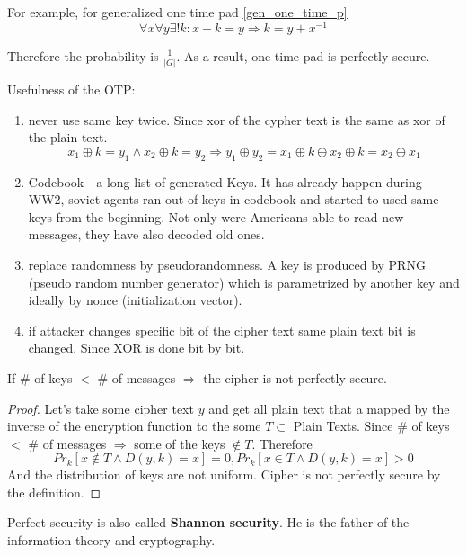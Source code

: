 \begin{example}
	For example, for generalized one time pad \cref{gen_one_time_p}
	\[ \forall x \forall y \exists !k: x + k = y \Rightarrow k = y + x^{-1} \]

	Therefore the probability is $\frac{1}{|G|}$. As a result, one time pad is perfectly secure.
\end{example}

\begin{properties}
Usefulness of the OTP:
	\begin{enumerate}
		\item never use same key twice. Since xor of the cypher text is the same as xor of the plain text.
		\[ x_1 \oplus k = y_1 \land x_2 \oplus k = y_2 \Rightarrow y_1 \oplus y_2 = x_1 \oplus k \oplus x_2 \oplus k = x_2 \oplus x_1 \]
		\item Codebook - a long list of generated Keys.
			It has already happen during WW2, soviet agents ran out of keys in codebook and started to used same keys from the beginning.
			Not only were Americans able to read new messages, they have also decoded old ones.
		\item replace randomness by pseudorandomness. A key is produced by PRNG (pseudo random number generator) which is parametrized by another key and ideally by nonce (initialization vector).
		\item if attacker changes specific bit of the cipher text same plain text bit is changed. Since XOR is done bit by bit.
	\end{enumerate}
\end{properties}

\begin{theorem}
	If \# of keys $<$ \# of messages $\Rightarrow$ the cipher is not perfectly secure.
\end{theorem}
\begin{proof}
	Let's take some cipher text $y$ and get all plain text that a mapped by the inverse of the encryption function to the some $T \subset $ Plain Texts. Since \# of keys $<$ \# of messages $\Rightarrow$ some of the keys $\notin T$.
	Therefore
	\[ Pr_k[x \notin T \land D(y, k) = x] = 0, Pr_k[x \in T \land D(y, k) = x] > 0 \]
	And the distribution of keys are not uniform. Cipher is not perfectly secure by the definition.
\end{proof}

\begin{note}
	Perfect security is also called \textbf{Shannon security}. He is the father of the information theory and cryptography.
\end{note}


